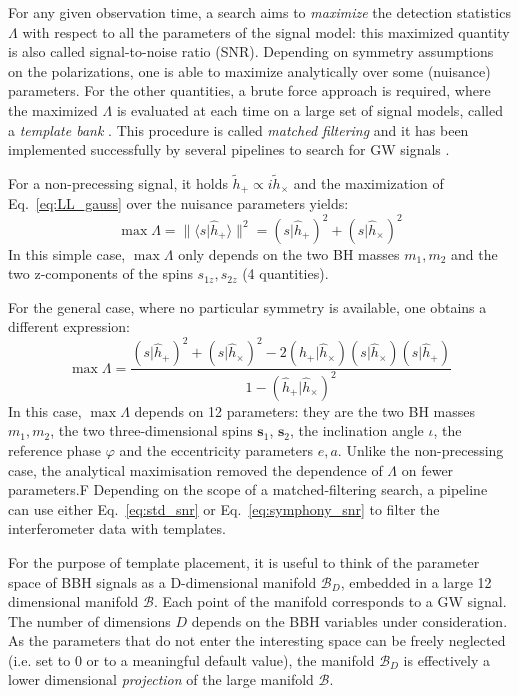 \documentclass[twocolumn,showpacs,preprintnumbers,nofootinbib,prd,
superscriptaddress,10pt]{revtex4-2}
\newcommand{\scalar}[2]{\langle #1|#2 \rangle}
\newcommand{\rescalar}[2]{( #1 |#2 )}
\begin{document}
For any given observation time, a search aims to {\it maximize} the detection statistics $\Lambda$ with respect to all the parameters of the signal model: this maximized quantity is also called signal-to-noise ratio (SNR).
Depending on symmetry assumptions on the polarizations, one is able to maximize analytically over some (nuisance) parameters.
For the other quantities, a brute force approach is required, where the maximized $\Lambda$ is evaluated at each time on a large set of signal models, called a {\it template bank} \cite{PhysRevD.77.104017, Mukherjee:2018yra}.
This procedure is called {\it matched filtering} and it has been implemented successfully by several pipelines to search for GW signals \cite{Privitera:2013xza, Usman:2015kfa, Capano:2016dsf, PhysRevD.95.042001, Nitz:2017svb, gstlal_paper2, Aubin:2020goo, Chu:2020pjv}.

For a non-precessing signal, it holds $\tilde{h}_+ \propto i\tilde{h}_\times$ and the maximization of Eq.~\eqref{eq:LL_gauss} over the nuisance parameters yields:
\begin{equation}\label{eq:std_snr}
	\max \Lambda = \lVert \scalar{s}{\hat{h}_+} \rVert^2 = \rescalar{s}{\hat{h}_+}^2 + \rescalar{s}{\hat{h}_\times}^2
\end{equation}
In this simple case, $\max\Lambda$ only depends on the two BH masses $m_1, m_2$ and the two z-components of the spins $s_{1z}, s_{2z}$ (4 quantities).

For the general case, where no particular symmetry is available, one obtains a different expression:
\begin{equation}\label{eq:symphony_snr}
	\max \Lambda = \frac{ \rescalar{s}{\hat{h}_+}^2 + \rescalar{s}{\hat{h}_\times}^2 -2\rescalar{\hat{h}_+}{\hat{h}_\times}\rescalar{s}{\hat{h}_\times}\rescalar{s}{\hat{h}_+}}{1- \rescalar{\hat{h}_+}{\hat{h}_\times}^2}
\end{equation}
In this case, $\max\Lambda$ depends on 12 parameters: they are the two BH masses $m_1, m_2$, the two three-dimensional spins $\mathbf{s}_1$, $\mathbf{s}_2$, the inclination angle $\iota$, the reference phase $\varphi$ and the eccentricity parameters $e, a$.
Unlike the non-precessing case, the analytical maximisation removed the dependence of $\Lambda$ on fewer parameters.F
Depending on the scope of a matched-filtering search, a pipeline can use either Eq.~\eqref{eq:std_snr} or Eq.~\eqref{eq:symphony_snr} to filter the interferometer data with templates.

For the purpose of template placement, it is useful to think of the parameter space of BBH signals as a D-dimensional manifold $\mathcal{B}_D$, embedded in a large 12 dimensional manifold $\mathcal{B}$. Each point of the manifold corresponds to a GW signal. The number of dimensions $D$ depends on the BBH variables under consideration.
As the parameters that do not enter the interesting space can be freely neglected (i.e. set to $0$ or to a meaningful default value), the manifold $\mathcal{B}_D$ is effectively a lower dimensional {\it projection} of the large manifold $\mathcal{B}$.
\end{document}
